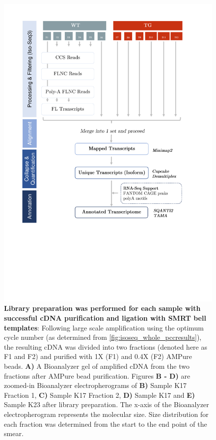 \begin{figure}[!htp]
	\centering
	\vspace{20pt}
	\includegraphics[page=3,trim={1cm 12cm 0 0cm},clip,scale = 0.8]{Figures/WholeTranscriptome_Figures.pdf}
	\captionsetup{width=0.95\textwidth}
	\caption[Iso-Seq Whole Transcriptome - cDNA purification and library preparation]%
	{\textbf{Library preparation was performed for each sample with successful cDNA purification and ligation with SMRT bell templates}: Following large scale amplification using the optimum cycle number (as determined from \cref{fig:isoseq_whole_pccresults}), the resulting cDNA was divided into two fractions (denoted here as F1 and F2) and purified with 1X (F1) and 0.4X (F2) AMPure beads. \textbf{A)} A Bioanalyzer gel of amplified cDNA from the two fractions after AMPure bead purification. Figures \textbf{B - D)} are zoomed-in Bioanalyzer electropherograms of \textbf{B)} Sample K17 Fraction 1, \textbf{C)} Sample K17 Fraction 2, \textbf{D)} Sample K17 and \textbf{E)} Sample K23 after library preparation. The x-axis of the Bioanalyzer electropherogram represents the molecular size. Size distribution for each fraction was determined from the start to the end point of the smear. 
}
\end{figure}
